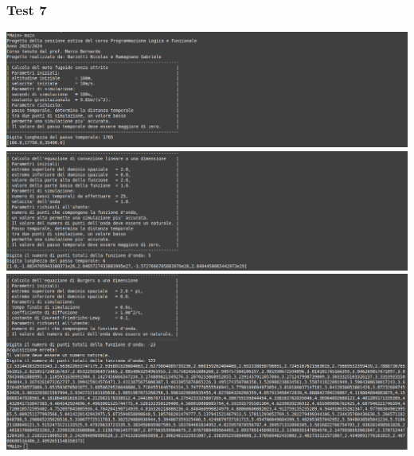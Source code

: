 \subsubsection*{Test 7}
\includegraphics[width=\textwidth,height=\textheight,keepaspectratio]{05_testing/image/hs/07_test/01_misto.png}
\\
\includegraphics[width=\textwidth,height=\textheight,keepaspectratio]{05_testing/image/hs/07_test/03_misto.png}
\\
\includegraphics[width=\textwidth,height=\textheight,keepaspectratio]{05_testing/image/hs/07_test/04_misto.png}

